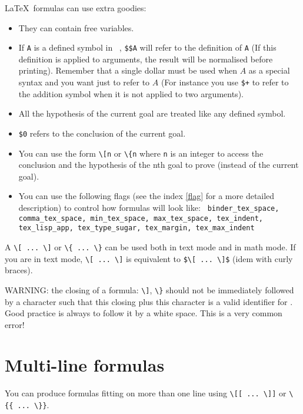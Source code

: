 \LaTeX\ formulas can use extra goodies:
\begin{itemize}
\item They can contain free variables.

\item If \verb#A# is a defined symbol in \AFD\ , \verb#$$A# will refer to the
  definition of \verb#A# (If this definition is applied to arguments, the
  result will be normalised before printing). Remember that a single dollar
  must be used when $A$ as a special syntax and you want just to refer to $A$
  (For instance you use \verb#$+# to refer to the addition symbol when it is
  not applied to two arguments).
  
\item All the hypothesis of the current goal are treated like any defined
  symbol.

\item \verb#$0# refers to the conclusion of the current goal.

\item You can use the form \verb#\[n# or \verb#\{n# where \verb#n# is an
  integer to access the conclusion and the hypothesis of the nth goal to prove
  (instead of the current goal).

\item You can use the following flags (see the index \ref{flag} for a more
detailed description) to control how formulas will look like: {\tt
binder\_tex\_space, comma\_tex\_space, min\_tex\_space, max\_tex\_space,
tex\_indent, \\ tex\_lisp\_app, tex\_type\_sugar, tex\_margin, tex\_max\_indent}

\end{itemize}

A \verb#\[ ... \]# or \verb#\{ ... \}# can be used both in text mode
and in math mode. If you are in text mode, \verb#\[ ... \]# is
equivalent to \verb#$\[ ... \]$# (idem with curly braces).

WARNING: the closing of a formula: \verb#\]#, \verb#\}#
 should not be immediately followed by a character such that this
closing plus this character is a valid identifier for \AFD. Good practice is
 always to follow it by a white space. This is a very common error!

\section{Multi-line formulas}

You can produce formulas fitting on more than one line using 
\verb#\[[ ... \]]# or \verb#\{{ ... \}}#. 

